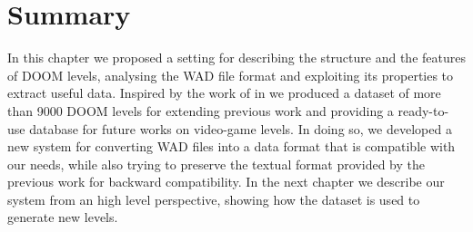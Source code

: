 \newpage
\section{Summary}
In this chapter we proposed a setting for describing the structure and the features of DOOM levels, analysing the WAD file format and exploiting its properties to extract useful data. Inspired by the work of \citeauthor{VGLC} in  we produced a dataset of more than 9000 DOOM levels for extending previous work and providing a ready-to-use database for future works on video-game levels. In doing so, we developed a new system for converting WAD files into a data format that is compatible with our needs, while also trying to preserve the textual format provided by the previous work for backward compatibility. In the next chapter we describe our system from an high level perspective, showing how the dataset is used to generate new levels.